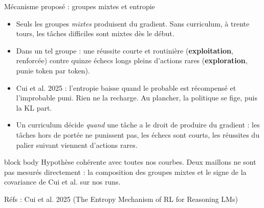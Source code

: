 \documentclass[aspectratio=169,10pt]{beamer}
\newcommand{\refs}[1]{\vfill{\tiny\textcolor{crMid}{Réfs : #1}}}
\newcommand{\hl}[1]{\textcolor{crOrange}{\textbf{#1}}}
\newenvironment{keymsg}{\begin{beamercolorbox}[sep=6pt,wd=\textwidth]{block body}\small}{\end{beamercolorbox}}
\begin{document}
\begin{frame}{Mécanisme proposé : groupes mixtes et entropie}
\begin{itemize}
  \item Seuls les groupes \emph{mixtes} produisent du gradient. Sans curriculum, à trente tours, les tâches difficiles sont mixtes dès le début.
  \item Dans un tel groupe : une réussite courte et routinière (\hl{exploitation}, renforcée) contre quinze échecs longs pleins d'actions rares (\hl{exploration}, punie token par token).
  \item Cui et al. 2025 : l'entropie baisse quand le probable est récompensé et l'improbable puni. Rien ne la recharge. Au plancher, la politique se fige, puis la KL part.
  \item Un curriculum décide \emph{quand} une tâche a le droit de produire du gradient : les tâches hors de portée ne punissent pas, les échecs sont courts, les réussites du palier suivant viennent d'actions rares.
\end{itemize}
\vspace{0.3cm}
\begin{keymsg}
Hypothèse cohérente avec toutes nos courbes. Deux maillons ne sont pas mesurés directement : la composition des groupes mixtes et le signe de la covariance de Cui et al. sur nos runs.
\end{keymsg}
\refs{Cui et al. 2025 (The Entropy Mechanism of RL for Reasoning LMs)}
\end{frame}
\end{document}
